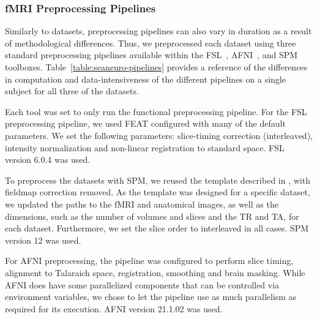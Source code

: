 \documentclass[fleqn,10pt]{wlscirep}
\begin{document}
    
    
    \subsubsection{fMRI Preprocessing Pipelines}
    
    Similarly to datasets, preprocessing pipelines can also vary in duration as
    a result of methodological differences. Thus, we preprocessed each dataset
    using three standard preprocessing pipelines available within the FSL~\cite{fsl},
    AFNI~\cite{cox1996afni}, and SPM~\cite{spm} toolboxes.
    Table~\ref{table:seaneuro-pipelines} provides a reference of the differences
    in computation and data-intensiveness of the different pipelines on a single
    subject for all three of the datasets.
    
    Each tool was set to only run the functional preprocessing pipeline. For the FSL preprocessing pipeline, 
    we used FEAT configured with many of
    the default parameters. We set the following parameters: slice-timing
    correction (interleaved), intensity normalization and non-linear
    registration to standard space. FSL version 6.0.4 was used.
    
    To preprocess the datasets with SPM, we reused the template described in
    \cite{haitas2021age}, with fieldmap correction removed. As the template was
    designed for a specific dataset, we updated the paths to the fMRI and
    anatomical images, as well as the dimensions, such as the number of volumes
    and slices and the TR and TA, for each dataset. Furthermore, we set the
    slice order to interleaved in all cases. SPM version 12 was used.
    
    For AFNI preprocessing, the pipeline was configured to perform slice timing,
    alignment to Talaraich space, registration, smoothing and brain masking.
    While AFNI does have some parallelized components that can be controlled via
    environment variables, we chose to let the pipeline use as much parallelism
    as required for its execution. AFNI version 21.1.02 was used.
\end{document}
